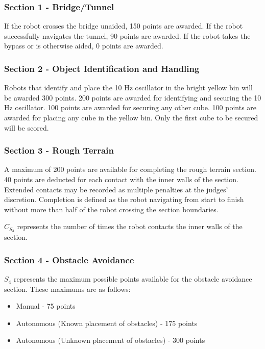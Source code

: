 \subsubsection{Section 1 - Bridge/Tunnel}
If the robot crosses the bridge unaided, 150 points are awarded. If the robot successfully navigates the tunnel, 90 points are awarded. If the robot takes the bypass or is otherwise aided, 0 points are awarded.

\subsubsection{Section 2 - Object Identification and Handling}

Robots that identify and place the 10 Hz oscillator in the bright yellow bin will be awarded 300 points. 200 points are awarded for identifying and securing the 10 Hz oscillator. 100 points are awarded for securing any other cube. 100 points are awarded for placing any cube in the yellow bin. Only the first cube to be secured will be scored. 

\subsubsection{Section 3 - Rough Terrain}
A maximum of 200 points are available for completing the rough terrain section. 40 points are deducted for each contact with the inner walls of the section. Extended contacts may be recorded as multiple penalties at the judges' discretion. Completion is defined as the robot navigating from start to finish without more than half of the robot crossing the section boundaries.

$C_{S_3}$ represents the number of times the robot contacts the inner walls of the section.

\subsubsection{Section 4 - Obstacle Avoidance}
$S_4$ represents the maximum possible points available for the obstacle avoidance section. These maximums are as follows: 

\begin{itemize}
\item Manual - 75 points
\item Autonomous (Known placement of obstacles) - 175 points
\item Autonomous (Unknown placement of obstacles) - 300 points
\end{itemize}

